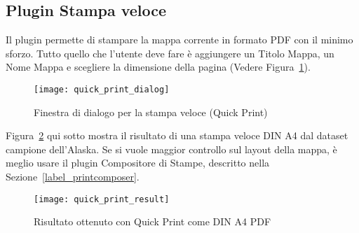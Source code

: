 
\subsection{Plugin Stampa veloce}


Il plugin  permette di stampare la mappa corrente in formato PDF con il minimo sforzo. Tutto quello che l'utente deve fare è aggiungere un Titolo Mappa, un Nome Mappa e scegliere la dimensione della pagina (Vedere Figura~\ref{fig:quickprint}). 
\begin{figure}[ht]
   \begin{center}
   \caption{Finestra di dialogo per la stampa veloce (Quick Print)  \nixcaption}\label{fig:quickprint}\smallskip
   \texttt{[image: quick\_print\_dialog]}
\end{center}
\end{figure}

Figura~\ref{fig:quickprint_result} qui sotto mostra il risultato di una stampa veloce DIN A4 dal dataset campione dell'Alaska. Se si vuole maggior controllo sul layout della mappa, è meglio usare il plugin Compositore di Stampe, descritto nella Sezione~\ref{label_printcomposer}.

\begin{figure}[ht]
   \begin{center}
   \caption{Risultato ottenuto con Quick Print come DIN A4 PDF\nixcaption}\label{fig:quickprint_result}\smallskip
   \texttt{[image: quick\_print\_result]}
\end{center}
\end{figure}


